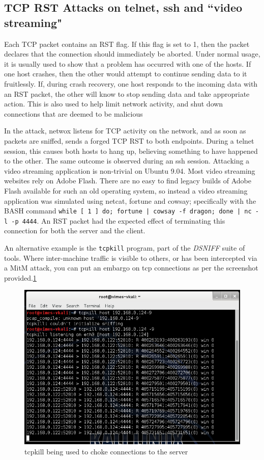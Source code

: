 \subsection{TCP RST Attacks on telnet, ssh and ``video streaming"}

Each TCP packet contains an RST flag. If this flag is set to 1, then the packet declares that the connection should
immediately be aborted. Under normal usage, it is usually used to show that a problem has occurred with one of the
hosts. If one host crashes, then the other would attempt to continue sending data to it fruitlessly. If, during crash
recovery, one host responds to the incoming data with an RST packet, the other will know to stop sending data and take
appropriate action. This is also used to help limit network activity, and shut down connections that are deemed to be
malicious

In the attack, netwox %
listens for TCP activity on the network, and as soon as packets are sniffed, sends a forged TCP RST to both endpoints.
During a telnet session, this causes both hosts to hang up, believing something to have happened to the other. The same
outcome is observed during an ssh session. Attacking a video streaming application is non-trivial on Ubuntu 9.04. Most
video streaming websites rely on Adobe Flash. There are no easy to find legacy builds of Adobe Flash available for such
an old operating system, so instead a video streaming application was simulated using netcat, fortune and cowsay;
specifically with the BASH command {\tt while [ 1 ] do; fortune | cowsay -f dragon; done | nc -l -p 4444}. An RST packet
had the expected effect of terminating this connection for both the server and the client.

An alternative example is the {\tt tcpkill} program, part of the \emph{DSNIFF} suite of tools. Where inter-machine
traffic is visible to others, or has been intercepted via a MitM attack, you can put an embargo on tcp connections as
per the screenshot provided.\ref{fig:tcpkill}

\begin{figure}[h]
    \centering
    \includegraphics[width=.5\linewidth]{images/tcpkill.png}
    \caption{tcpkill being used to choke connections to the server}
    \label{fig:tcpkill}
\end{figure}

